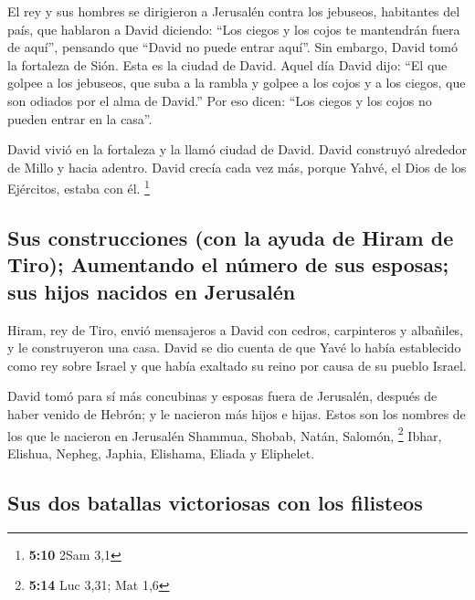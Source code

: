  El rey y sus hombres se dirigieron a Jerusalén contra los
jebuseos, habitantes del país, que hablaron a David diciendo: ``Los
ciegos y los cojos te mantendrán fuera de aquí'', pensando que ``David
no puede entrar aquí''.  Sin embargo, David tomó la
fortaleza de Sión. Esta es la ciudad de David.  Aquel día
David dijo: ``El que golpee a los jebuseos, que suba a la rambla y
golpee a los cojos y a los ciegos, que son odiados por el alma de
David.'' Por eso dicen: ``Los ciegos y los cojos no pueden entrar en la
casa''.

 David vivió en la fortaleza y la llamó ciudad de David.
David construyó alrededor de Millo y hacia adentro. 
David crecía cada vez más, porque Yahvé, el Dios de los Ejércitos,
estaba con él. \footnote{\textbf{5:10} 2Sam 3,1}

\hypertarget{sus-construcciones-con-la-ayuda-de-hiram-de-tiro-aumentando-el-nuxfamero-de-sus-esposas-sus-hijos-nacidos-en-jerusaluxe9n}{%
\subsection{Sus construcciones (con la ayuda de Hiram de Tiro);
Aumentando el número de sus esposas; sus hijos nacidos en
Jerusalén}\label{sus-construcciones-con-la-ayuda-de-hiram-de-tiro-aumentando-el-nuxfamero-de-sus-esposas-sus-hijos-nacidos-en-jerusaluxe9n}}

 Hiram, rey de Tiro, envió mensajeros a David con cedros,
carpinteros y albañiles, y le construyeron una casa. 
David se dio cuenta de que Yavé lo había establecido como rey sobre
Israel y que había exaltado su reino por causa de su pueblo Israel.

 David tomó para sí más concubinas y esposas fuera de
Jerusalén, después de haber venido de Hebrón; y le nacieron más hijos e
hijas.  Estos son los nombres de los que le nacieron en
Jerusalén Shammua, Shobab, Natán, Salomón, \footnote{\textbf{5:14} Luc
  3,31; Mat 1,6}  Ibhar, Elishua, Nepheg, Japhia,
 Elishama, Eliada y Eliphelet.

\hypertarget{sus-dos-batallas-victoriosas-con-los-filisteos}{%
\subsection{Sus dos batallas victoriosas con los
filisteos}\label{sus-dos-batallas-victoriosas-con-los-filisteos}}

